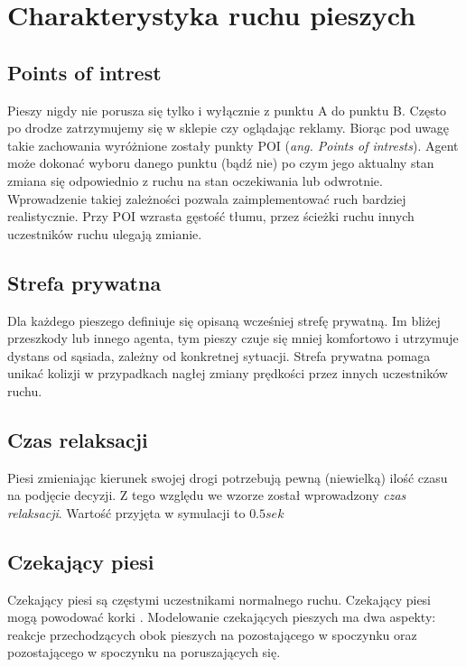 \chapter{Charakterystyka ruchu pieszych}
\label{cha:charakterystykaRuchu}

\section{Points of intrest}
\label{sec:pointsOfInterest}

Pieszy nigdy nie porusza się tylko i wyłącznie z punktu A do punktu B. Często po drodze zatrzymujemy się w sklepie czy oglądając reklamy. Biorąc pod uwagę takie zachowania wyróżnione zostały punkty POI (\textit{ang. Points of intrests}). Agent może dokonać wyboru danego punktu (bądź nie) po czym jego aktualny stan zmiana się odpowiednio z ruchu na stan oczekiwania lub odwrotnie. Wprowadzenie takiej zależności pozwala zaimplementować ruch bardziej realistycznie. Przy POI wzrasta gęstość tłumu, przez ścieżki ruchu innych uczestników ruchu ulegają zmianie.
 
\section{Strefa prywatna}
\label{sec:strefaPryw}

Dla każdego pieszego definiuje się opisaną wcześniej strefę prywatną. Im bliżej przeszkody lub innego agenta, tym pieszy czuje się mniej komfortowo i utrzymuje dystans od sąsiada, zależny od konkretnej sytuacji. Strefa prywatna pomaga unikać kolizji w przypadkach nagłej zmiany prędkości przez innych uczestników ruchu.

\section{Czas relaksacji}
\label{sec:czasRelaksacji}

Piesi zmieniając kierunek swojej drogi potrzebują pewną (niewielką) ilość czasu na podjęcie decyzji. Z tego względu we wzorze został wprowadzony \textit{czas relaksacji}. Wartość przyjęta w symulacji to $0.5 sek$

\section{Czekający piesi}
\label{sec:czekajacyPiesi}

Czekający piesi są częstymi uczestnikami normalnego ruchu. Czekający piesi mogą powodować korki \cite{6}. Modelowanie czekających pieszych ma dwa aspekty: reakcje  przechodzących obok pieszych na pozostającego w spoczynku oraz pozostającego w spoczynku na poruszających się.

